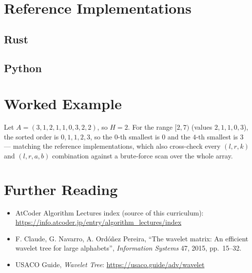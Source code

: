 \documentclass[11pt]{article}
\begin{document}
\section{Reference Implementations}

\codenote
\subsection{Rust}

\subsection{Python}

\section{Worked Example}
\begin{examplebox}
Let $A = (3,1,2,1,1,0,3,2,2)$, so $H = 2$. For the range $[2, 7)$ (values
$2,1,1,0,3$), the sorted order is $0,1,1,2,3$, so the $0$-th smallest is
$0$ and the $4$-th smallest is $3$ --- matching the reference
implementations, which also cross-check every $(l, r, k)$ and $(l, r, a,
b)$ combination against a brute-force scan over the whole array.
\end{examplebox}

\section{Further Reading}
\begin{itemize}[leftmargin=1.5em]
  \item AtCoder Algorithm Lectures index (source of this curriculum):
        \url{https://info.atcoder.jp/entry/algorithm_lectures/index}
  \item F. Claude, G. Navarro, A. Ordóñez Pereira, ``The wavelet matrix: An
        efficient wavelet tree for large alphabets'', \emph{Information
        Systems} 47, 2015, pp.\ 15--32.
  \item USACO Guide, \emph{Wavelet Tree}: \url{https://usaco.guide/adv/wavelet}
\end{itemize}
\end{document}
